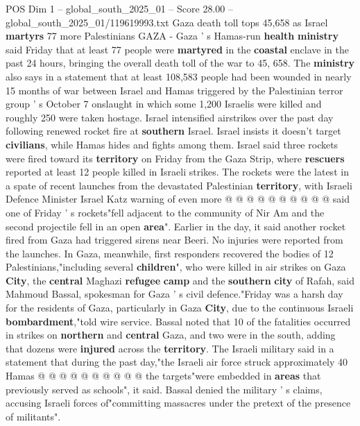 \begin{textsample}{POS Dim 1 – global\_south\_2025\_01 – Score 28.00 – global\_south\_2025\_01/119619993.txt}  \label{ex:f1_pos_294}
Gaza death toll tops 45,658 as Israel \textbf{martyrs} 77 more Palestinians GAZA - Gaza ' s Hamas-run \textbf{health} \textbf{ministry} said Friday that at least 77 people were \textbf{martyred} in the \textbf{coastal} enclave in the past 24 hours, bringing the overall death toll of the war to 45, 658.
The \textbf{ministry} also says in a statement that at least 108,583 people had been wounded in nearly 15 months of war between Israel and Hamas triggered by the Palestinian terror group ' s October 7 onslaught in which some 1,200 Israelis were killed and roughly 250 were taken hostage.
Israel intensified airstrikes over the past day following renewed rocket fire at \textbf{southern} Israel.
Israel insists it doesn't target \textbf{civilians}, while Hamas hides and fights among them.
Israel said three rockets were fired toward its \textbf{territory} on Friday from the Gaza Strip, where \textbf{rescuers} reported at least 12 people killed in Israeli strikes.
The rockets were the latest in a spate of recent launches from the devastated Palestinian \textbf{territory}, with Israeli Defence Minister Israel Katz warning of even more @ @ @ @ @ @ @ @ @ @ said one of Friday ' s rockets"fell adjacent to the community of Nir Am and the second projectile fell in an open \textbf{area}".
Earlier in the day, it said another rocket fired from Gaza had triggered sirens near Beeri.
No injuries were reported from the launches.
In Gaza, meanwhile, first responders recovered the bodies of 12 Palestinians,"including several \textbf{children}", who were killed in air strikes on Gaza \textbf{City}, the \textbf{central} Maghazi \textbf{refugee} \textbf{camp} and the \textbf{southern} \textbf{city} of Rafah, said Mahmoud Bassal, spokesman for Gaza ' s civil defence."Friday was a harsh day for the residents of Gaza, particularly in Gaza \textbf{City}, due to the continuous Israeli \textbf{bombardment},"told wire service.
Bassal noted that 10 of the fatalities occurred in strikes on \textbf{northern} and \textbf{central} Gaza, and two were in the south, adding that dozens were \textbf{injured} across the \textbf{territory}.
The Israeli military said in a statement that during the past day,"the Israeli air force struck approximately 40 Hamas @ @ @ @ @ @ @ @ @ @ the targets"were embedded in \textbf{areas} that previously served as schools", it said.
Bassal denied the military ' s claims, accusing Israeli forces of"committing massacres under the pretext of the presence of militants".

\end{textsample}
